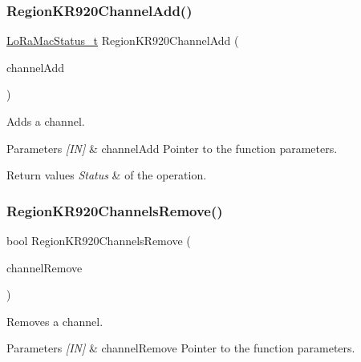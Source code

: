 \subsubsection{\texorpdfstring{Region\+K\+R920\+Channel\+Add()}{RegionKR920ChannelAdd()}}
{\footnotesize\ttfamily \hyperlink{group__LORAMAC_ga30bd25657e10480f8605ee951b0ecfbd}{Lo\+Ra\+Mac\+Status\+\_\+t} Region\+K\+R920\+Channel\+Add (\begin{DoxyParamCaption}\item[{\hyperlink{group__REGION_gab1c5f3aa06614283202906cef4417860}{Channel\+Add\+Params\+\_\+t} $\ast$}]{channel\+Add }\end{DoxyParamCaption})}



Adds a channel. 


\begin{DoxyParams}{Parameters}
{\em \mbox{[}\+I\+N\mbox{]}} & channel\+Add Pointer to the function parameters.\\
\hline
\end{DoxyParams}

\begin{DoxyRetVals}{Return values}
{\em Status} & of the operation. \\
\hline
\end{DoxyRetVals}
\mbox{\label{group__REGIONKR920_gaada1222081dd856fe052d63f94bb78dd}} 
\subsubsection{\texorpdfstring{Region\+K\+R920\+Channels\+Remove()}{RegionKR920ChannelsRemove()}}
{\footnotesize\ttfamily bool Region\+K\+R920\+Channels\+Remove (\begin{DoxyParamCaption}\item[{\hyperlink{group__REGION_gaa37468560d2fc81a977b57a48e5d72c0}{Channel\+Remove\+Params\+\_\+t} $\ast$}]{channel\+Remove }\end{DoxyParamCaption})}



Removes a channel. 


\begin{DoxyParams}{Parameters}
{\em \mbox{[}\+I\+N\mbox{]}} & channel\+Remove Pointer to the function parameters.\\
\hline
\end{DoxyParams}

